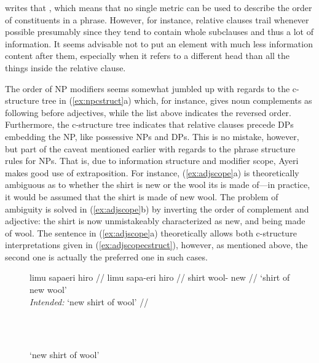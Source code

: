 \citet{wasow1997} writes that , which means
that no single metric can be used to describe the order of constituents in a
phrase. However, for instance, relative clauses trail whenever possible
presumably since they tend to contain whole subclauses and thus a lot of
information. It seems advisable not to put an element with much less
information content after them, especially when it refers to a different head
than all the things inside the relative clause.

The order of NP modifiers seems somewhat jumbled up with regards to the
c-structure tree in (\ref{ex:npcstruct}a) which, for instance, gives noun
complements as following  before adjectives, while the list above
indicates the reversed order. Furthermore, the c-structure tree indicates that
relative clauses precede DPs embedding the NP, like possessive NPs and DPs.
This is no mistake, however, but part of the caveat mentioned earlier with
regards to the phrase structure rules for NPs. That is, due to information
structure and modifier scope, Ayeri makes good use of extraposition. For
instance, (\ref{ex:adjscope}a) is theoretically ambiguous as to whether the
shirt is new or the wool its is made of---in practice, it would be assumed that
the shirt is made of new wool. The problem of ambiguity is solved in
(\ref{ex:adjscope}b) by inverting the order of complement and adjective: the
shirt is now unmistakeably characterized as new, and being made of wool. The
sentence in (\ref{ex:adjscope}a) theoretically allows both c-structure
interpretations given in (\ref{ex:adjscopecstruct}), however, as mentioned
above, the second one is actually the preferred one in such cases.

\begin{figure}[h]
\ex{}\label{ex:adjscope}
\begin{minipage}[t]{.5\remaining}
\tl\quad\label{ex:adjscope_1}\ljudge\excl%
\begingl
	\gla limu sapaeri hiro //
	\glb limu sapa-eri hiro //
	\glc shirt wool-\Ins{} new //
	\glft `shirt of new wool'\\
		\textit{Intended:} `new shirt of wool' //
\endgl
\end{minipage}
~
\begin{minipage}[t]{.5\remaining}
\tl\quad\label{ex:adjscope_2}%
\begin{minipage}[t]{\linewidth}
	 \\
	`new shirt of wool'
\end{minipage}
\end{minipage}
\xe
\end{figure}

